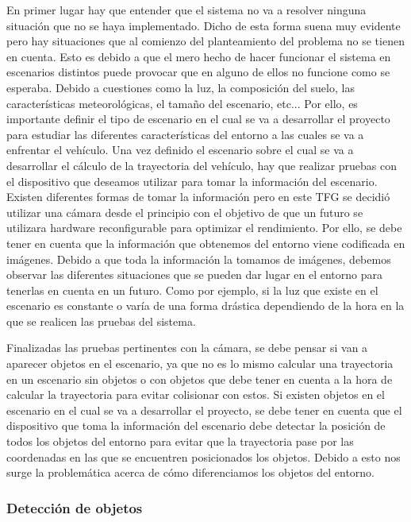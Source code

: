 En primer lugar hay que entender que el sistema no va a resolver ninguna situación que no se haya implementado. Dicho de esta forma suena muy evidente pero hay situaciones que al comienzo del planteamiento del problema no se tienen en cuenta. Esto es debido a que el mero hecho de hacer funcionar el sistema en escenarios distintos puede provocar que en alguno de ellos no funcione como se esperaba. Debido a cuestiones como la luz, la composición del suelo, las características meteorológicas, el tamaño del escenario, etc... Por ello, es importante definir el tipo de escenario en el cual se va a desarrollar el proyecto para estudiar las diferentes características del entorno a las cuales se va a enfrentar el vehículo. Una vez definido el escenario sobre el cual se va a desarrollar el cálculo de la trayectoria del vehículo, hay que realizar pruebas con el dispositivo que deseamos utilizar para tomar la información del escenario. Existen diferentes formas de tomar la información pero en este \ac{TFG} se decidió utilizar una cámara desde el principio con el objetivo de que un futuro se utilizara hardware reconfigurable para optimizar el rendimiento. Por ello, se debe tener en cuenta que la información que obtenemos del entorno viene codificada en imágenes. Debido a que toda la información la tomamos de imágenes, debemos observar las diferentes situaciones que se pueden dar lugar en el entorno para tenerlas en cuenta en un futuro. Como por ejemplo, si la luz que existe en el escenario es constante o varía de una forma drástica dependiendo de la hora en la que se realicen las pruebas del sistema. 

Finalizadas las pruebas pertinentes con la cámara, se debe pensar si van a aparecer objetos en el escenario, ya que no es lo mismo calcular una trayectoria en un escenario sin objetos o con objetos que debe tener en cuenta a la hora de calcular la trayectoria para evitar colisionar con estos. Si existen objetos en el escenario en el cual se va a desarrollar el proyecto, se debe tener en cuenta que el dispositivo que toma la información del escenario debe detectar la posición de todos los objetos del entorno para evitar que la trayectoria pase por las coordenadas en las que se encuentren posicionados los objetos. Debido a esto nos surge la problemática acerca de cómo diferenciamos los objetos del entorno.

\subsubsection{Detección de objetos}

